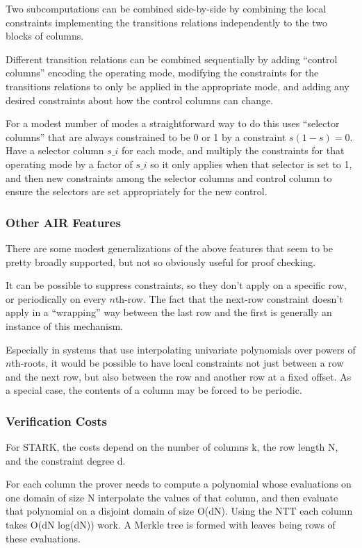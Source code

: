 \documentclass{article}
\theoremstyle{plain}
\theoremstyle{definition}
\begin{document}
Two subcomputations can be combined side-by-side by combining the local
constraints implementing the transitions relations independently to the
two blocks of columns.

Different transition relations can be combined sequentially by adding
``control columns'' encoding the operating mode, modifying the
constraints for the transitions relations to only be applied in the
appropriate mode, and adding any desired constraints about how the
control columns can change.

For a modest number of modes a straightforward way to do this uses
``selector columns'' that are always constrained to be 0 or 1 by a
constraint $s(1-s)=0$. Have a selector column $s\_i$ for
each mode, and multiply the constraints for that operating mode by a
factor of $s\_i$ so it only applies when that selector is set to
1, and then new constraints among the selector columns and control
column to ensure the selectors are set appropriately for the new
control.

\subsubsection{Other AIR Features}\label{other-common-features}

There are some modest generalizations of the above features that seem to
be pretty broadly supported, but not so obviously useful for proof
checking.

It can be possible to suppress constraints, so they don't apply on a
specific row, or periodically on every $n$th-row. The fact that the
next-row constraint doesn't apply in a ``wrapping'' way between the last
row and the first is generally an instance of this mechanism.

Especially in systems that use interpolating univariate polynomials over
powers of $n$th-roots, it would be possible to have local constraints
not just between a row and the next row, but also between the row and
another row at a fixed offset.
As a special case, the contents of a column may be forced to be periodic.

\subsubsection{Verification Costs}\label{verification-costs}

For STARK, the costs depend on the number of columns k, the row length
N, and the constraint degree d.

For each column the prover needs to compute a polynomial whose
evaluations on one domain of size N interpolate the values of that
column, and then evaluate that polynomial on a disjoint domain of size
O(dN). Using the NTT each column takes O(dN log(dN)) work. A Merkle tree
is formed with leaves being rows of these evaluations.
\end{document}
